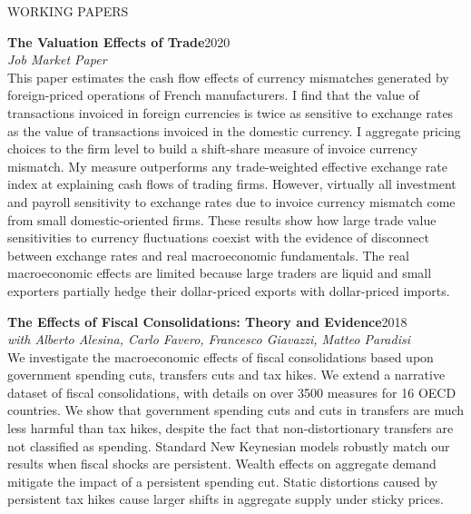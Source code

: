 \documentclass{resume} %
\begin{document}
\begin{rSection}{WORKING PAPERS}

{\textbf{The Valuation Effects of Trade}\hfill{2020}}\\\textit{Job Market Paper}\\
{This paper estimates the cash flow effects of currency mismatches generated by foreign-priced operations of French manufacturers. I find that the value of transactions invoiced in foreign currencies is twice as sensitive to exchange rates as the value of transactions invoiced in the domestic currency. I aggregate pricing choices to the firm level to build a
shift-share measure of invoice currency mismatch. My measure outperforms any trade-weighted effective exchange rate index at explaining cash flows of trading firms. However, virtually all investment and payroll sensitivity to exchange rates due to invoice currency mismatch come from small domestic-oriented firms. These results show how large trade value sensitivities to currency fluctuations coexist with the evidence of disconnect between exchange rates and real macroeconomic fundamentals. The real macroeconomic effects are limited because large traders are liquid and small exporters partially hedge their dollar-priced exports with dollar-priced imports.}


\bigskip

\textbf{The Effects of Fiscal Consolidations: Theory and Evidence}\hfill2018\\
\textit{with Alberto Alesina, Carlo Favero, Francesco Giavazzi, Matteo Paradisi}\\
{We investigate the macroeconomic effects of fiscal consolidations based upon government spending cuts, transfers cuts and tax hikes. We extend a narrative dataset of fiscal consolidations, with details on over 3500 measures for 16 OECD countries. We show that government spending cuts and cuts in transfers are 	much less harmful than tax hikes, despite the fact that non-distortionary transfers are not classified as spending. Standard New Keynesian models robustly match our results when fiscal shocks are persistent. 	Wealth effects on aggregate demand mitigate the impact of a persistent spending cut. Static distortions caused by persistent tax hikes cause larger shifts in aggregate supply under sticky prices.}

\end{rSection} 



\end{document}

